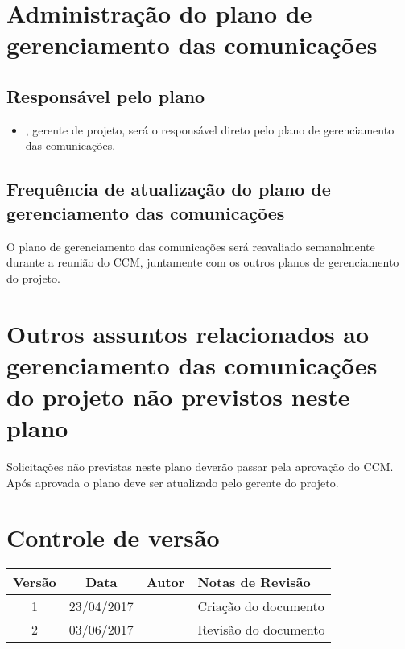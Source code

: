 \section{Administração do plano de gerenciamento das comunicações}

\subsection{Responsável pelo plano}

\begin{itemize}
	\item \projectManagerName{}, gerente de projeto, será o responsável direto pelo plano de gerenciamento das comunicações.
\end{itemize}

\subsection{Frequência de atualização do plano de gerenciamento das comunicações}

O plano de gerenciamento das comunicações será reavaliado semanalmente durante a reunião do CCM, juntamente com os outros planos de gerenciamento do projeto.

\section{Outros assuntos relacionados ao gerenciamento das comunicações do projeto não previstos neste plano}

Solicitações não previstas neste plano deverão passar pela aprovação do CCM. Após aprovada o plano deve ser atualizado pelo gerente do projeto.

\section{Controle de versão}

\begin{table}[H]
	\begin{tabularx}{\textwidth}{| c | c | X | X |}
		\hline
		\textbf{Versão} & \textbf{Data} & \textbf{Autor}        & \textbf{Notas de Revisão} \\
		\hline
		1                &     23/04/2017          & \projectManagerName{} & Criação do documento     \\
		\hline
		2                &     03/06/2017          & \projectManagerName{} & Revisão do documento     \\
		\hline
	\end{tabularx}
	\centering
\end{table}

